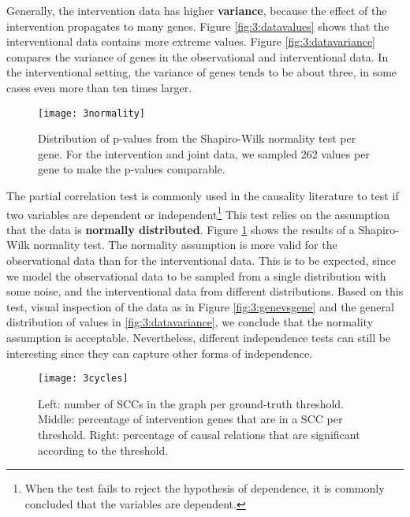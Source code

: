 Generally, the intervention data has higher \textbf{variance}, because the effect of the intervention propagates to many genes. Figure \ref{fig:3:datavalues} shows that the interventional data contains more extreme values. Figure \ref{fig:3:datavariance} compares the variance of genes in the observational and interventional data. In the interventional setting, the variance of genes tends to be about three, in some cases even more than ten times larger.

\begin{figure}[h]
    \centering
    \texttt{[image: 3normality]}
    \caption{Distribution of p-values from the Shapiro-Wilk normality test per gene. For the intervention and joint data, we sampled 262 values per gene to make the p-values comparable.}
    \label{fig:3:normality}
\end{figure}   

The partial correlation test is commonly used in the causality literature to test if two variables are dependent or independent\footnote{When the test fails to reject the hypothesis of dependence, it is commonly concluded that the variables are dependent.} This test relies on the assumption that the data is \textbf{normally distributed}. Figure \ref{fig:3:normality} shows the results of a Shapiro-Wilk normality test. The normality assumption is more valid for the observational data than for the interventional data. This is to be expected, since we model the observational data to be sampled from a single distribution with some noise, and the interventional data from different distributions. Based on this test, visual inspection of the data as in Figure \ref{fig:3:genevsgene} and the general distribution of values in \ref{fig:3:datavariance}, we conclude that the normality assumption is acceptable. Nevertheless, different independence tests can still be interesting since they can capture other forms of independence. 

\begin{figure}[h]
    \centering
    \texttt{[image: 3cycles]}
    \caption{Left: number of SCCs in the graph per ground-truth threshold. Middle: percentage of intervention genes that are in a SCC per threshold. Right: percentage of causal relations that are significant according to the threshold.}
    \label{fig:3:cycles}
\end{figure}    

